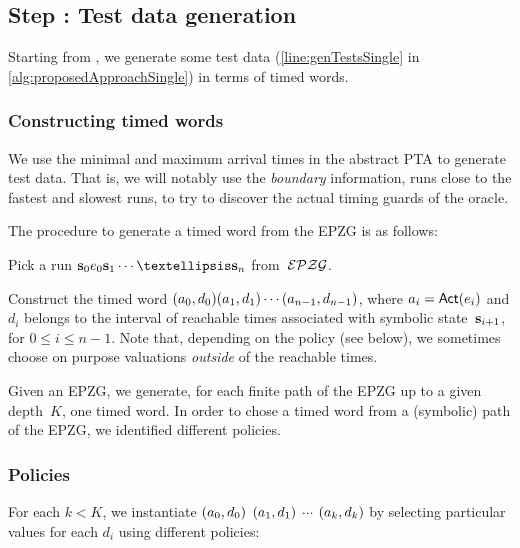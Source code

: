 \begin{tikzborder}{\cite{Gargantini16:validation}}
\begin{tikzborder}{\cite{gargantini_combinatorial_2017}}
\begin{tikzborder}{\cite{garn2019}}
\begin{tikzborder}{\cite{arcaini2019achieving}}
\begin{tikzborder}{\cite{arcaini2019varivolution}}
\subsection{Step : Test data generation}\label{sec:testDataGen}
\begin{tikzborder}{}
Starting from \epzg, we generate some test data (\ref{line:genTestsSingle} in \ref{alg:proposedApproachSingle}) in terms of timed words.
\end{tikzborder}

\subsubsection{Constructing timed words}
\begin{tikzborder}{}
We use the minimal and maximum arrival times in the abstract PTA to generate test data.
That is, we will notably use the \emph{boundary} information, \ie{} runs close to the fastest and slowest runs, to try to discover the actual timing guards of the oracle.

The procedure to generate a timed word from the EPZG is as follows:
\begin{compactenum}
	\item Pick a run $\symbstate_0 \edge_0 \symbstate_1 \cdots … \symbstate_n$ from~$\mathcal{EPZG}$.
	\item Construct the timed word $(a_0, d_0) (a_1, d_1) \cdots (a_{n-1}, d_{n-1})$, where $a_i = \mathsf{Act}(e_i)$ and $d_i$ belongs to the interval of reachable times associated with symbolic state~$\mathbf{s}_{i+1}$, for $0 \leq i \leq n - 1$.
	Note that, depending on the policy (see below), we sometimes choose on purpose valuations \emph{outside} of the reachable times.
\end{compactenum}

Given an EPZG, we generate, for each finite path of the EPZG up to a given depth~$K$, one timed word.
In order to chose a timed word from a (symbolic) path of the EPZG, we identified different policies.
\end{tikzborder}

\subsubsection{Policies}
\begin{tikzborder}{}
For each $k < K$, we instantiate $(a_0, d_0)$ $(a_1, d_1)$ $\cdots$ $(a_k, d_k)$ by selecting particular values for each $d_i$ using different policies:


\end{tikzborder}
\end{tikzborder}
\end{tikzborder}
\end{tikzborder}
\end{tikzborder}
\end{tikzborder}
